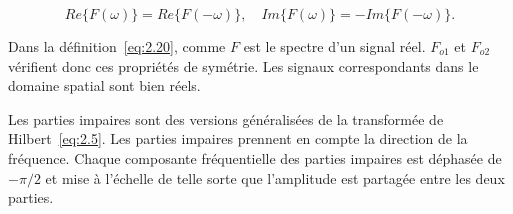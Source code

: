 \begin{equation}
    Re\{F(\omega)\} = Re\{F(-\omega)\}, \quad Im\{F(\omega)\} = -Im\{F(-\omega)\}.
\end{equation}

\noindent Dans la définition~\ref{eq:2.20}, comme $F$ est le spectre d'un signal réel. $F_{o1}$ et $F_{o2}$ vérifient donc ces propriétés de symétrie. Les signaux correspondants dans le domaine spatial sont bien réels.

\bigskip

Les parties impaires sont des versions généralisées de la transformée de Hilbert~\ref{eq:2.5}. Les parties impaires prennent en compte la direction de la fréquence. Chaque composante fréquentielle des parties impaires est déphasée de $-\pi/2$ et mise à l'échelle de telle sorte que l'amplitude est partagée entre les deux parties.

\bigskip

